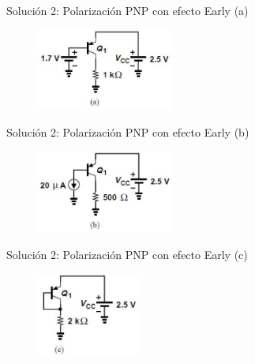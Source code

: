 \documentclass[t,aspectratio=169]{beamer}
\begin{document}
\begin{frame}{Solución 2: Polarización PNP con efecto Early (a)}

\begin{figure}
    \flushleft
    \includegraphics[width=0.4\textwidth]{figuras/efecto_early_ejemplo_2_a.png}
\end{figure}
    
\end{frame}


\begin{frame}{Solución 2: Polarización PNP con efecto Early (b)}

\begin{figure}
    \flushleft
    \includegraphics[width=0.4\textwidth]{figuras/efecto_early_ejemplo_2_b.png}
\end{figure}
    
\end{frame}


\begin{frame}{Solución 2: Polarización PNP con efecto Early (c)}

\begin{figure}
    \flushleft
    \includegraphics[width=0.3\textwidth]{figuras/efecto_early_ejemplo_2_c.png}
\end{figure}
    
\end{frame}
\end{document}
